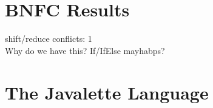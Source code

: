 \documentclass[]{article}
\begin{document}
\section{BNFC Results}
  shift/reduce conflicts:  1\\
  Why do we have this? If/IfElse mayhabps?

\section{The Javalette Language}




\end{document}
